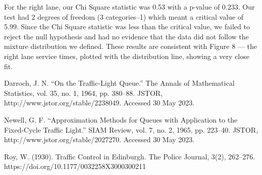 \documentclass[12pt, a4paper]{article}
\begin{document}
	For the right lane, our Chi Square statistic was 0.53 with a p-value of 0.233.
	Our test had 2 degrees of freedom (3 categories–1) which meant a critical value of 5.99. Since the Chi Square statistic was less than the critical value, we failed to reject the null hypothesis and had no evidence that the data did not follow the mixture distribution we defined.  These results are consistent with Figure 8 --- the right lane service times, plotted with the distribution line, showing a very close fit.
	
		
	\begin{thebibliography}{9}
	Darroch, J. N. “On the Traffic-Light Queue.” The Annals of Mathematical Statistics, vol. 35, no. 1, 1964, pp. 380–88. JSTOR, http://www.jstor.org/stable/2238049. Accessed 30 May 2023.
	
	Newell, G. F. “Approximation Methods for Queues with Application to the Fixed-Cycle Traffic Light.” SIAM Review, vol. 7, no. 2, 1965, pp. 223–40. JSTOR, http://www.jstor.org/stable/2027270. Accessed 30 May 2023.
	
	Roy, W. (1930). Traffic Control in Edinburgh. The Police Journal, 3(2), 262–276. https://doi.org/10.1177/0032258X3000300211
	\end{thebibliography}
	
\end{document}
